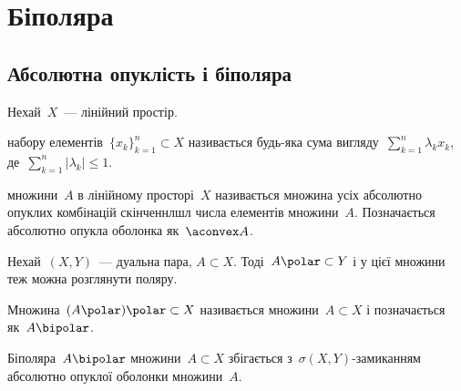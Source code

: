 \chapter{Біполяра}

\section{Абсолютна опуклість і біполяра}

\begin{definition}
    Нехай~$X$~--- лінійний простір.
    
     набору елементів~$\{x_k\}_{k = 1}^n \subset X$ називається будь-яка сума вигляду~$\sum_{k = 1}^n \lambda_k x_k$, де~$\sum_{k = 1}^n |\lambda_k| \le 1$.
\end{definition}

\begin{definition}
     множини~$A$ в лінійному просторі~$X$ називається множина усіх абсолютно опуклих комбінацій скінченнлшл числа елементів множини~$A$. Позначається абсолютно опукла оболонка як~$\aconvex A$.
\end{definition}

Нехай~$(X, Y)$~--- дуальна пара, $A \subset X$. Тоді~$A\polar \subset Y$ і у цієї множини теж можна розглянути поляру.

\begin{definition}
    Множина~$(A\polar)\polar \subset X$ називається  множини~$A \subset X$ і позначається як~$A\bipolar$.
\end{definition}

\begin{theorem}
    Біполяра~$A\bipolar$ множини~$A \subset X$ збігається з~$\sigma(X, Y)$-замиканням абсолютно опуклої оболонки множини~$A$.
\end{theorem}

